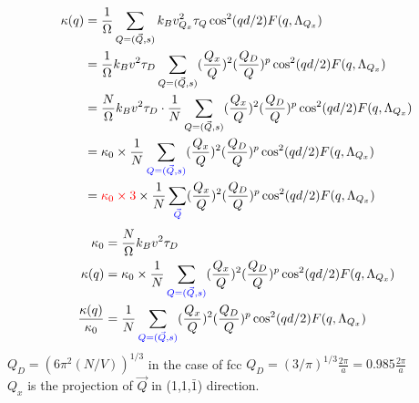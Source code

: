 \documentclass{article}
\author{}
\begin{document}
\begin{equation*}
\begin{split}
\kappa(q)&=\frac{1}{\Omega}\sum\limits_{Q=(\vec{Q},s)}k_B v^2_{Q_x}\tau_Q\cos^2(qd/2)F(q,\Lambda_{Q_x})\\
&=\frac{1}{\Omega}k_B v^2\tau_D \sum\limits_{Q=(\vec{Q},s)}(\frac{Q_x}{Q})^2(\frac{Q_D}{Q})^p\cos^2(qd/2)F(q,\Lambda_{Q_x})\\
&=\frac{N}{\Omega}k_B v^2\tau_D \cdot\frac{1}{N}\sum\limits_{Q=(\vec{Q},s)}(\frac{Q_x}{Q})^2(\frac{Q_D}{Q})^p\cos^2(qd/2)F(q,\Lambda_{Q_x})\\
&=\kappa_0\times\frac{1}{N}\sum\limits_{\color{blue}Q=(\vec{Q},s)}(\frac{Q_x}{Q})^2(\frac{Q_D}{Q})^p\cos^2(qd/2)F(q,\Lambda_{Q_x})\\
&={\color{red}\kappa_0\times 3}\times{\frac{1}{N}\sum\limits_{\color{blue}\vec{Q}}(\frac{Q_x}{Q})^2(\frac{Q_D}{Q})^p\cos^2(qd/2)F(q,\Lambda_{Q_x})}\\
\end{split}
\end{equation*}
\begin{equation*}
\begin{split}
\kappa_0 &=\frac{N}{\Omega}k_B v^2\tau_D\\
\kappa(q)&=\kappa_0\times\frac{1}{N}\sum\limits_{\color{blue}Q=(\vec{Q},s)}(\frac{Q_x}{Q})^2(\frac{Q_D}{Q})^p\cos^2(qd/2)F(q,\Lambda_{Q_x})\\
\frac{\kappa(q)}{\kappa_0}&=\frac{1}{N}\sum\limits_{\color{blue}Q=(\vec{Q},s)}(\frac{Q_x}{Q})^2(\frac{Q_D}{Q})^p\cos^2(qd/2)F(q,\Lambda_{Q_x})\\
\end{split}
\end{equation*}
$Q_D=(6\pi^2(N/V))^{1/3}$ in the case of fcc $Q_D=(3/\pi)^{1/3}\frac{2\pi}{a}=0.985\frac{2\pi}{a}$\\
$Q_x$ is the projection of $\vec{Q}$ in (1,1,$\bar{1}$) direction.
\end{document}
